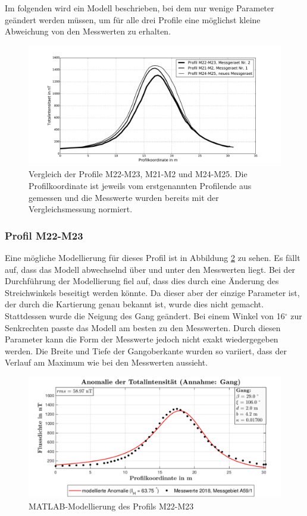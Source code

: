 Im folgenden wird ein Modell beschrieben, bei dem nur wenige Parameter geändert werden müssen, um für alle drei Profile eine möglichst kleine Abweichung von den Messwerten zu erhalten.

\begin{figure}
 \centering
 \includegraphics[width=\textwidth]{fig/Vergleich_nahe_Profile.pdf}
 \caption[Vergleich der Profile M22-M23, M21-M2 und M24-M25]{Vergleich der Profile M22-M23, M21-M2 und M24-M25. Die Profilkoordinate ist jeweils vom erstgenannten Profilende aus gemessen und die Messwerte wurden bereits mit der Vergleichsmessung normiert.}
 \label{fig:Vergleich_Profile}
\end{figure}

\subsubsection{Profil M22-M23}

Eine mögliche Modellierung für dieses Profil ist in Abbildung \ref{fig:modM22} zu sehen. Es fällt auf, dass das Modell abwechselnd über und unter den Messwerten liegt. Bei der Durchführung der Modellierung fiel auf, dass dies durch eine Änderung des Streichwinkels beseitigt werden könnte. Da dieser aber der einzige Parameter ist, der durch die Kartierung genau bekannt ist, wurde dies nicht gemacht. Stattdessen wurde die Neigung des Gang geändert. Bei einem Winkel von 16$^\circ$ zur Senkrechten passte das Modell am besten zu den Messwerten. Durch diesen Parameter kann die Form der Messwerte jedoch nicht exakt wiedergegeben werden. Die Breite und Tiefe der Gangoberkante wurden so variiert, dass der Verlauf am Maximum wie bei den Messwerten aussieht.

\begin{figure}
 \centering
 \includegraphics[width=\textwidth]{fig/modM22}
 \caption{MATLAB-Modellierung des Profils M22-M23}
 \label{fig:modM22}
\end{figure}


